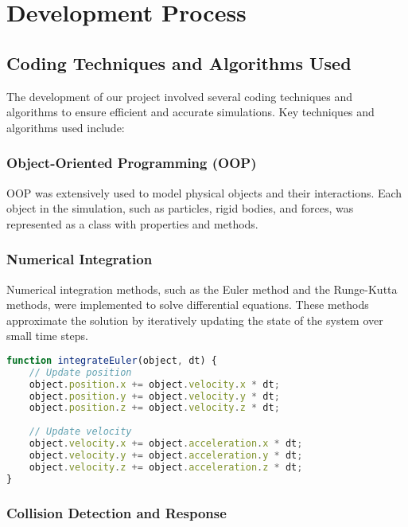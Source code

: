 \chapter{Development Process}

\section{Coding Techniques and Algorithms Used}

The development of our project involved several coding techniques and algorithms to ensure efficient and accurate simulations. Key techniques and algorithms used include:

\subsection{Object-Oriented Programming (OOP)}

OOP was extensively used to model physical objects and their interactions. Each object in the simulation, such as particles, rigid bodies, and forces, was represented as a class with properties and methods.

\subsection{Numerical Integration}

Numerical integration methods, such as the Euler method and the Runge-Kutta methods, were implemented to solve differential equations. These methods approximate the solution by iteratively updating the state of the system over small time steps.

\begin{lstlisting}[language=JavaScript, caption=Euler Integration Method]
function integrateEuler(object, dt) {
    // Update position
    object.position.x += object.velocity.x * dt;
    object.position.y += object.velocity.y * dt;
    object.position.z += object.velocity.z * dt;
    
    // Update velocity
    object.velocity.x += object.acceleration.x * dt;
    object.velocity.y += object.acceleration.y * dt;
    object.velocity.z += object.acceleration.z * dt;
}
\end{lstlisting}

\subsection{Collision Detection and Response}

